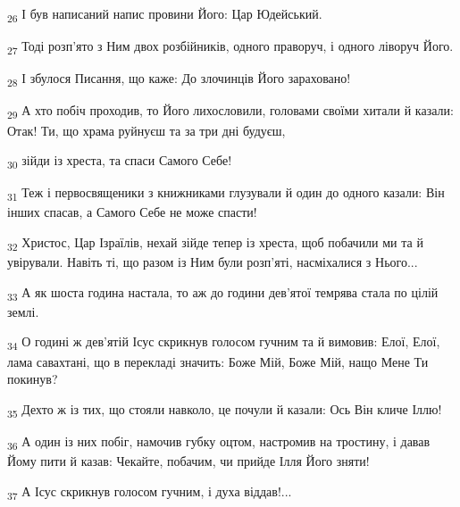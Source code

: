 \begin{tcolorbox}
\textsubscript{26} І був написаний напис провини Його: Цар Юдейський.
\end{tcolorbox}
\begin{tcolorbox}
\textsubscript{27} Тоді розп'ято з Ним двох розбійників, одного праворуч, і одного ліворуч Його.
\end{tcolorbox}
\begin{tcolorbox}
\textsubscript{28} І збулося Писання, що каже: До злочинців Його зараховано!
\end{tcolorbox}
\begin{tcolorbox}
\textsubscript{29} А хто побіч проходив, то Його лихословили, головами своїми хитали й казали: Отак! Ти, що храма руйнуєш та за три дні будуєш,
\end{tcolorbox}
\begin{tcolorbox}
\textsubscript{30} зійди із хреста, та спаси Самого Себе!
\end{tcolorbox}
\begin{tcolorbox}
\textsubscript{31} Теж і первосвященики з книжниками глузували й один до одного казали: Він інших спасав, а Самого Себе не може спасти!
\end{tcolorbox}
\begin{tcolorbox}
\textsubscript{32} Христос, Цар Ізраїлів, нехай зійде тепер із хреста, щоб побачили ми та й увірували. Навіть ті, що разом із Ним були розп'яті, насміхалися з Нього...
\end{tcolorbox}
\begin{tcolorbox}
\textsubscript{33} А як шоста година настала, то аж до години дев'ятої темрява стала по цілій землі.
\end{tcolorbox}
\begin{tcolorbox}
\textsubscript{34} О годині ж дев'ятій Ісус скрикнув голосом гучним та й вимовив: Елої, Елої, лама савахтані, що в перекладі значить: Боже Мій, Боже Мій, нащо Мене Ти покинув?
\end{tcolorbox}
\begin{tcolorbox}
\textsubscript{35} Дехто ж із тих, що стояли навколо, це почули й казали: Ось Він кличе Іллю!
\end{tcolorbox}
\begin{tcolorbox}
\textsubscript{36} А один із них побіг, намочив губку оцтом, настромив на тростину, і давав Йому пити й казав: Чекайте, побачим, чи прийде Ілля Його зняти!
\end{tcolorbox}
\begin{tcolorbox}
\textsubscript{37} А Ісус скрикнув голосом гучним, і духа віддав!...
\end{tcolorbox}
